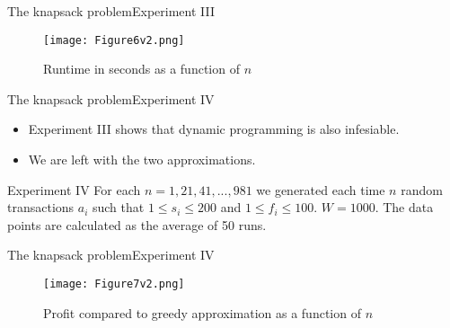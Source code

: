 \documentclass{beamer}
\begin{document}
\begin{frame}{The knapsack problem}{Experiment III} %
    \begin{figure}
        \centering
        \texttt{[image: Figure6v2.png]}
        \caption{Runtime in seconds as a function of $n$}
    \end{figure}
\end{frame}
\begin{frame}{The knapsack problem}{Experiment IV} %
    \begin{itemize}
        \item {Experiment III shows that dynamic programming is also 
        infesiable.}
        \item {We are left with the two approximations.}
    \end{itemize}
    \begin{block}{Experiment IV}
    For each $n=1,21,41,...,981$ we generated each time $n$ random 
    transactions $a_i$ such that $1\leq s_i\leq 200$ and 
    $1\leq f_i \leq 100$. $W = 1000$. The data points are calculated as 
    the average of 50 runs.
    \end{block}
\end{frame}

\begin{frame}{The knapsack problem}{Experiment IV} %
    \begin{figure}
        \centering
        \texttt{[image: Figure7v2.png]}
        \caption{Profit compared to greedy approximation as a function of 
        $n$}
    \end{figure}
\end{frame}
\end{document}
